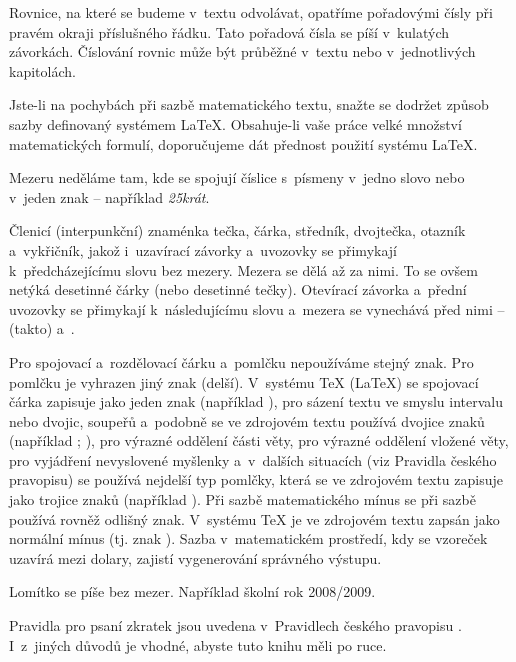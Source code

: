 Rovnice, na které se budeme v~textu odvolávat, opatříme pořadovými čísly při pravém okraji příslušného řádku. Tato pořadová čísla se píší v~kulatých závorkách. Číslování rovnic může být průběžné v~textu nebo v~jednotlivých kapitolách.

Jste-li na pochybách při sazbě matematického textu, snažte se dodržet způsob sazby definovaný systémem LaTeX. Obsahuje-li vaše práce velké množství matematických formulí, doporučujeme dát přednost použití systému LaTeX.

Mezeru neděláme tam, kde se spojují číslice s~písmeny v~jedno slovo nebo v~jeden znak -- například {\it 25krát}.

Členicí (interpunkční) znaménka tečka, čárka, středník, dvojtečka, otazník a~vykřičník, jakož i~uzavírací závorky a~uvozovky se přimykají k~předcházejícímu slovu bez mezery. Mezera se dělá až za nimi. To se ovšem netýká desetinné čárky (nebo desetinné tečky). Otevírací závorka a~přední uvozovky se přimykají k~následujícímu slovu a~mezera se vynechává před nimi -- (takto) a~.

Pro spojovací a~rozdělovací čárku a~pomlčku nepoužíváme stejný znak. Pro pomlčku je vyhrazen jiný znak (delší). V~systému TeX (LaTeX) se spojovací čárka zapisuje jako jeden znak  (například ), pro sázení textu ve smyslu intervalu nebo dvojic, soupeřů a~podobně se ve zdrojovém textu používá dvojice znaků  (například ; ), pro výrazné oddělení části věty, pro výrazné oddělení vložené věty, pro vyjádření nevyslovené myšlenky a~v~dalších situacích (viz Pravidla českého pravopisu) se používá nejdelší typ pomlčky, která se ve zdrojovém textu zapisuje jako trojice znaků  (například ). Při sazbě matematického mínus se při sazbě používá rovněž odlišný znak. V~systému TeX je ve zdrojovém textu zapsán jako normální mínus (tj. znak ). Sazba v~matematickém prostředí, kdy se vzoreček uzavírá mezi dolary, zajistí vygenerování správného výstupu.

Lomítko se píše bez mezer. Například školní rok 2008/2009.

Pravidla pro psaní zkratek jsou uvedena v~Pravidlech českého pravopisu \cite{Pravidla}. I~z~jiných důvodů je vhodné, abyste tuto knihu měli po ruce. 


